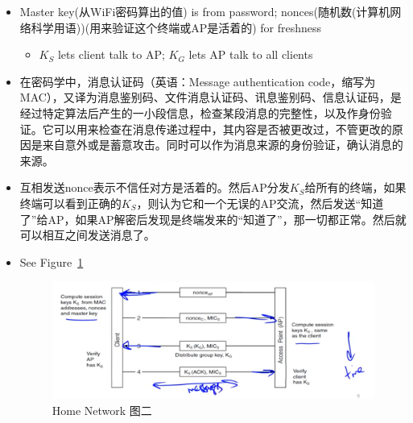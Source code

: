 \documentclass[12pt]{ctexart}   %
\begin{document}
\begin{itemize}
		\item Master key(从WiFi密码算出的值) is from password; nonces(随机数(计算机网络科学用语))(用来验证这个终端或AP是活着的) for freshness
		\begin{itemize}
			\item $K_S$ lets client talk to AP; $K_G$ lets AP talk to all clients
		\end{itemize}
		\item 在密码学中，消息认证码（英语：Message authentication code，缩写为MAC），又译为消息鉴别码、文件消息认证码、讯息鉴别码、信息认证码，是经过特定算法后产生的一小段信息，检查某段消息的完整性，以及作身份验证。它可以用来检查在消息传递过程中，其内容是否被更改过，不管更改的原因是来自意外或是蓄意攻击。同时可以作为消息来源的身份验证，确认消息的来源。

		\item 互相发送nonce表示不信任对方是活着的。然后AP分发$K_S$给所有的终端，如果终端可以看到正确的$K_S$，则认为它和一个无误的AP交流，然后发送“知道了”给AP，如果AP解密后发现是终端发来的“知道了”，那一切都正常。然后就可以相互之间发送消息了。
		\item See Figure~\ref{fig:10-4-5}
		  
		\begin{figure}[h!] %
		\centering
		\includegraphics[scale=0.7]{images/10-4-5}
		\caption{Home Network 图二}
		\label{fig:10-4-5}
		\end{figure}
	\end{itemize}
\end{document}
